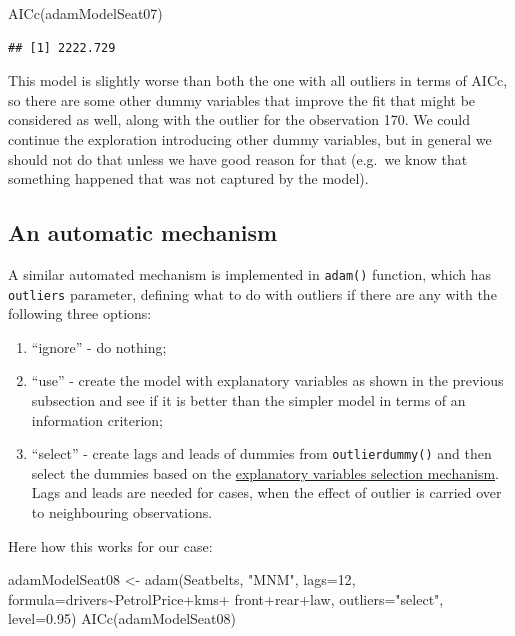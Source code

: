 \documentclass[
]{book}
\newenvironment{Shaded}{\begin{snugshade}}{\end{snugshade}}
\newcommand{\AttributeTok}[1]{\textcolor[rgb]{0.77,0.63,0.00}{#1}}
\newcommand{\DecValTok}[1]{\textcolor[rgb]{0.00,0.00,0.81}{#1}}
\newcommand{\FloatTok}[1]{\textcolor[rgb]{0.00,0.00,0.81}{#1}}
\newcommand{\FunctionTok}[1]{\textcolor[rgb]{0.00,0.00,0.00}{#1}}
\newcommand{\NormalTok}[1]{#1}
\newcommand{\OtherTok}[1]{\textcolor[rgb]{0.56,0.35,0.01}{#1}}
\newcommand{\SpecialCharTok}[1]{\textcolor[rgb]{0.00,0.00,0.00}{#1}}
\newcommand{\StringTok}[1]{\textcolor[rgb]{0.31,0.60,0.02}{#1}}
\providecommand{\tightlist}{%
  \setlength{\itemsep}{0pt}\setlength{\parskip}{0pt}}
\theoremstyle{definition}
\theoremstyle{definition}
\theoremstyle{definition}
\theoremstyle{definition}
\theoremstyle{remark}
\begin{document}
\begin{Shaded}
\begin{Highlighting}[]
\FunctionTok{AICc}\NormalTok{(adamModelSeat07)}
\end{Highlighting}
\end{Shaded}

\begin{verbatim}
## [1] 2222.729
\end{verbatim}

This model is slightly worse than both the one with all outliers in terms of AICc, so there are some other dummy variables that improve the fit that might be considered as well, along with the outlier for the observation 170. We could continue the exploration introducing other dummy variables, but in general we should not do that unless we have good reason for that (e.g.~we know that something happened that was not captured by the model).

\hypertarget{an-automatic-mechanism}{%
\subsection{An automatic mechanism}\label{an-automatic-mechanism}}

A similar automated mechanism is implemented in \texttt{adam()} function, which has \texttt{outliers} parameter, defining what to do with outliers if there are any with the following three options:

\begin{enumerate}
\def\labelenumi{\arabic{enumi}.}
\tightlist
\item
  ``ignore'' - do nothing;
\item
  ``use'' - create the model with explanatory variables as shown in the previous subsection and see if it is better than the simpler model in terms of an information criterion;
\item
  ``select'' - create lags and leads of dummies from \texttt{outlierdummy()} and then select the dummies based on the \protect\hyperlink{ETSXSelection}{explanatory variables selection mechanism}. Lags and leads are needed for cases, when the effect of outlier is carried over to neighbouring observations.
\end{enumerate}

Here how this works for our case:

\begin{Shaded}
\begin{Highlighting}[]
\NormalTok{adamModelSeat08 }\OtherTok{\textless{}{-}} \FunctionTok{adam}\NormalTok{(Seatbelts, }\StringTok{"MNM"}\NormalTok{, }\AttributeTok{lags=}\DecValTok{12}\NormalTok{,}
                        \AttributeTok{formula=}\NormalTok{drivers}\SpecialCharTok{\textasciitilde{}}\NormalTok{PetrolPrice}\SpecialCharTok{+}\NormalTok{kms}\SpecialCharTok{+}
\NormalTok{                          front}\SpecialCharTok{+}\NormalTok{rear}\SpecialCharTok{+}\NormalTok{law,}
                        \AttributeTok{outliers=}\StringTok{"select"}\NormalTok{, }\AttributeTok{level=}\FloatTok{0.95}\NormalTok{)}
\FunctionTok{AICc}\NormalTok{(adamModelSeat08)}
\end{Highlighting}
\end{Shaded}
\end{document}
